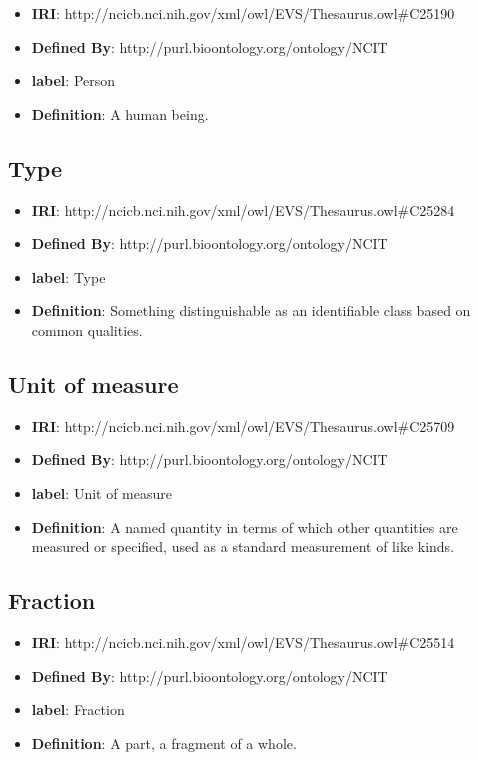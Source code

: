 \documentclass[a4paper,12pt,oneside]{article}
\begin{document}
\begin{itemize}
	\item \textbf{IRI}: http://ncicb.nci.nih.gov/xml/owl/EVS/Thesaurus.owl\#C25190
	\item \textbf{Defined By}: http://purl.bioontology.org/ontology/NCIT
	\item \textbf{label}: Person
	\item \textbf{Definition}: A human being.
\end{itemize}
  
  \subsection{Type}

\begin{itemize}
	\item \textbf{IRI}: http://ncicb.nci.nih.gov/xml/owl/EVS/Thesaurus.owl\#C25284
	\item \textbf{Defined By}: http://purl.bioontology.org/ontology/NCIT
	\item \textbf{label}: Type
	\item \textbf{Definition}: Something distinguishable as an identifiable class based on common qualities.
\end{itemize}

  \subsection{Unit of measure}

\begin{itemize}
	\item \textbf{IRI}: http://ncicb.nci.nih.gov/xml/owl/EVS/Thesaurus.owl\#C25709
	\item \textbf{Defined By}: http://purl.bioontology.org/ontology/NCIT
	\item \textbf{label}: Unit of measure
	\item \textbf{Definition}: A named quantity in terms of which other quantities are measured or specified, used as a standard measurement of like kinds.
\end{itemize}

  \subsection{Fraction}

\begin{itemize}
	\item \textbf{IRI}: http://ncicb.nci.nih.gov/xml/owl/EVS/Thesaurus.owl\#C25514
	\item \textbf{Defined By}: http://purl.bioontology.org/ontology/NCIT
	\item \textbf{label}: Fraction
	\item \textbf{Definition}: A part, a fragment of a whole.
\end{itemize}
\end{document}
